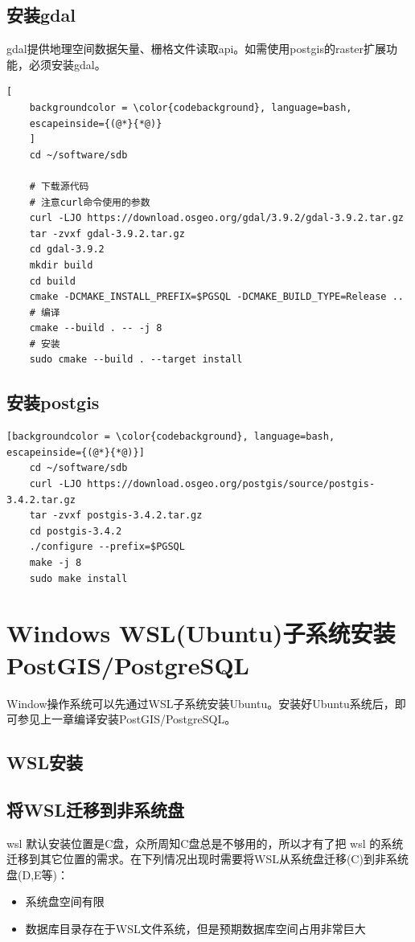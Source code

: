 \section{安装gdal}
gdal提供地理空间数据矢量、栅格文件读取api。如需使用postgis的raster扩展功能，必须安装gdal。
\begin{lstlisting}[
	backgroundcolor = \color{codebackground}, language=bash, 
	escapeinside={(@*}{*@)}
	]
	cd ~/software/sdb
	
	# 下载源代码
	# 注意curl命令使用的参数
	curl -LJO https://download.osgeo.org/gdal/3.9.2/gdal-3.9.2.tar.gz
	tar -zvxf gdal-3.9.2.tar.gz
	cd gdal-3.9.2
	mkdir build
	cd build
	cmake -DCMAKE_INSTALL_PREFIX=$PGSQL -DCMAKE_BUILD_TYPE=Release ..
	# 编译
	cmake --build . -- -j 8
	# 安装
	sudo cmake --build . --target install 
\end{lstlisting}


\section{安装postgis}
\begin{lstlisting}[backgroundcolor = \color{codebackground}, language=bash, escapeinside={(@*}{*@)}]
	cd ~/software/sdb
	curl -LJO https://download.osgeo.org/postgis/source/postgis-3.4.2.tar.gz
	tar -zvxf postgis-3.4.2.tar.gz
	cd postgis-3.4.2
	./configure --prefix=$PGSQL 
	make -j 8
	sudo make install
\end{lstlisting}



\chapter{Windows WSL(Ubuntu)子系统安装PostGIS/PostgreSQL}

Window操作系统可以先通过WSL子系统安装Ubuntu。安装好Ubuntu系统后，即可参见上一章编译安装PostGIS/PostgreSQL。

\section{WSL安装}

\section{将WSL迁移到非系统盘}

wsl 默认安装位置是C盘，众所周知C盘总是不够用的，所以才有了把 wsl 的系统迁移到其它位置的需求。在下列情况出现时需要将WSL从系统盘迁移(C)到非系统盘(D,E等)：
\begin{itemize}
	\item 系统盘空间有限
	\item 数据库目录存在于WSL文件系统，但是预期数据库空间占用非常巨大
\end{itemize}


